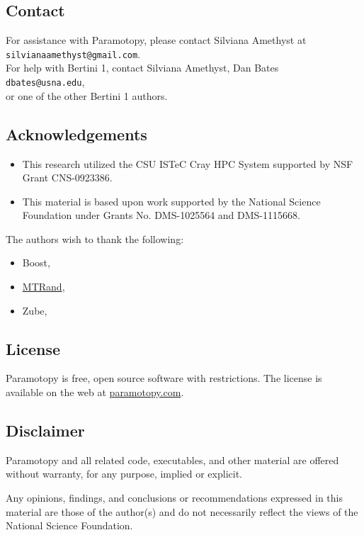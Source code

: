 \clearpage

\subsection{Contact}
\label{sec:contact}
For assistance with Paramotopy, please contact Silviana Amethyst at \\
\texttt{silvianaamethyst@gmail.com}.  \\For help with Bertini 1, contact Silviana Amethyst, Dan Bates \\
\texttt{dbates@usna.edu}, \\or one of the other Bertini 1 authors.

\subsection*{Acknowledgements}
\begin{itemize}
\item  This research utilized the CSU ISTeC Cray HPC System supported by NSF Grant CNS-0923386.
\item  This material is based upon work supported by the National Science Foundation under Grants No. DMS-1025564 and DMS-1115668.
\end{itemize}

The authors wish to thank the following:
\begin{itemize}
	\item Boost,
	\item \href{http://www.bedaux.net/mtrand/}{MTRand},
	\item Zube,
\end{itemize}

\clearpage
\subsection{License}
\label{sec:license}
Paramotopy is free, open source software with restrictions.  The license is available on the web at \href{https://paramotopy.com/resources/programs/paramotopy_license.txt}{paramotopy.com}.

\subsection*{Disclaimer}
Paramotopy and all related code, executables, and other material are offered without warranty, for any purpose, implied or explicit. 

Any opinions, findings, and conclusions or recommendations expressed in this material are those of the author(s) and do not necessarily reflect the views of the National Science Foundation.




